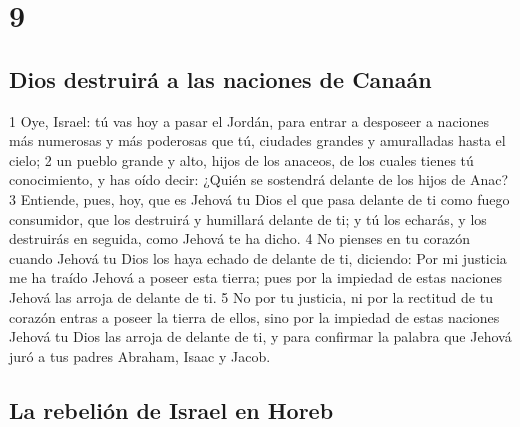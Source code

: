 \chapter{9}


\section{Dios destruirá a las naciones de Canaán}


1 Oye, Israel: tú vas hoy a pasar el Jordán, para entrar a desposeer a naciones más numerosas y más poderosas que tú, ciudades grandes y amuralladas hasta el cielo;
2 un pueblo grande y alto, hijos de los anaceos, de los cuales tienes tú conocimiento, y has oído decir: ¿Quién se sostendrá delante de los hijos de Anac?
3 Entiende, pues, hoy, que es Jehová tu Dios el que pasa delante de ti como fuego consumidor, que los destruirá y humillará delante de ti; y tú los echarás, y los destruirás en seguida, como Jehová te ha dicho.
4 No pienses en tu corazón cuando Jehová tu Dios los haya echado de delante de ti, diciendo: Por mi justicia me ha traído Jehová a poseer esta tierra; pues por la impiedad de estas naciones Jehová las arroja de delante de ti.
5 No por tu justicia, ni por la rectitud de tu corazón entras a poseer la tierra de ellos, sino por la impiedad de estas naciones Jehová tu Dios las arroja de delante de ti, y para confirmar la palabra que Jehová juró a tus padres Abraham, Isaac y Jacob.

\section{La rebelión de Israel en Horeb }

